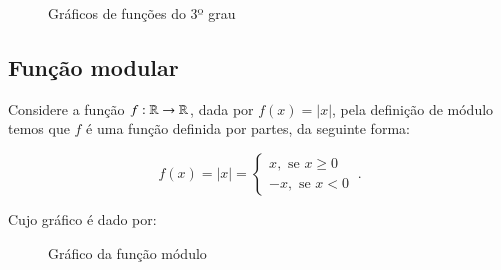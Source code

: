 \begin{itemize}
  \begin{figure}[H]
   \caption{Gráficos de funções do 3º grau}
  \end{figure}

 \end{itemize}


  \subsection{Função modular}

  Considere a função $f: \mathbb{R} \rightarrow \mathbb{R}$, dada por $f(x)= |x|$, pela definição de módulo temos que $f$ é uma função definida por partes, da seguinte forma:

  \[f(x)= |x| = \begin{cases}
                 x, \text{ se } x \geq 0 \\
                 -x, \text{ se } x < 0
                \end{cases} \ .\]

 Cujo gráfico é dado por:

  \begin{figure}[H]
 \centering
    \caption{Gráfico da função módulo}
  \end{figure}

